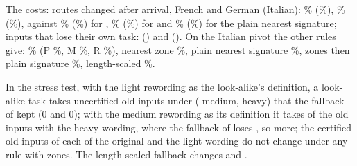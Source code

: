 The costs: routes changed after arrival, French and German (Italian): \scaled{} \RerouteBgChanged{}\% (\RerouteBgItChanged{}\%), \certscaled{} \RerouteCertFourChanged{}\% (\RerouteCertFourItChanged{}\%), against \RerouteCertChanged{}\% (\RerouteCertItChanged{}\%) for \cert{}, \RerouteNearChanged{}\% (\RerouteNearItChanged{}\%) for \nearest{} and \RerouteSigChanged{}\% (\RerouteSigItChanged{}\%) for the plain nearest signature; inputs that lose their own task: \RerouteBgNLost{} (\scaled{}) and \RerouteCertFourNLost{} (\certscaled{}). On the Italian pivot the other rules give: \cert{} \RerouteCertItOwn{}\% (\textsf{P} \WidenRefTfiveItP{}\%, \textsf{M} \WidenRefTfiveItM{}\%, \textsf{R} \WidenRefTfiveItR{}\%),
nearest zone \RerouteNearItOwn{}\%, plain nearest signature \RerouteSigItOwn{}\%, zones then plain signature \RerouteHybItOwn{}\%, length-scaled \RerouteNormItOwn{}\%.

\begin{table}[t]
  \caption{The stress test of Section~\ref{sec:stress} with the scaled fallbacks: a sixth task whose definition is the light (upper block) or the medium (lower block) rewording of the definition of task~2 arrives after the five tasks; old test inputs of task~2 (\RerouteStressOld{} per wording) routed elsewhere afterwards. The inputs with the original and the light wording are certified under every rule with zones. In the lower block the medium wording is the look-alike's own wording, so its \RerouteStressOld{} are re-routed under every rule.}
  \label{tab:reroutestress}
  \centering
  \footnotesize
  
\end{table}

In the stress test, with the light rewording as the look-alike's definition, a look-alike task takes \RerouteStressTaken{} uncertified old inputs under \certscaled{} (\RerouteStressCertFourMedium{} medium, \RerouteStressCertFourHeavy{} heavy) that the fallback of \cert{} kept (0 and 0); with the medium rewording as its definition it takes \RerouteStressMedCertFourHeavy{} of the \RerouteStressOld{} old inputs with the heavy wording, where the fallback of \cert{} loses \RerouteStressMedCertHeavy{}, so \RerouteStressMedExtra{} more; the \RerouteStressOld{} certified old inputs of each of the original and the light wording do not change under any rule with zones. The length-scaled fallback changes \RerouteStressNormMedium{} and \RerouteStressNormHeavy{}.

